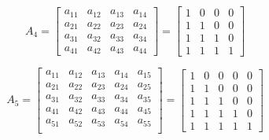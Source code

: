 \documentclass[12pt,letterpaper,final]{report}
\begin{document}
\[
  A_4 =
  \begin{bmatrix}
    a_{11} & a_{12} & a_{13} & a_{14} \\
    a_{21} & a_{22} & a_{23} & a_{24} \\
    a_{31} & a_{32} & a_{33} & a_{34} \\
    a_{41} & a_{42} & a_{43} & a_{44}
  \end{bmatrix}
  =
  \begin{bmatrix}
    1 & 0 & 0 & 0 \\
    1 & 1 & 0 & 0 \\
    1 & 1 & 1 & 0 \\
    1 & 1 & 1 & 1
  \end{bmatrix}
\]

\[
  A_5 =
  \begin{bmatrix}
    a_{11} & a_{12} & a_{13} & a_{14} & a_{15} \\
    a_{21} & a_{22} & a_{23} & a_{24} & a_{25} \\
    a_{31} & a_{32} & a_{33} & a_{34} & a_{35} \\
    a_{41} & a_{42} & a_{43} & a_{44} & a_{45} \\
    a_{51} & a_{52} & a_{53} & a_{54} & a_{55} \\
  \end{bmatrix}
  =
  \begin{bmatrix}
    1 & 0 & 0 & 0 & 0 \\
    1 & 1 & 0 & 0 & 0 \\
    1 & 1 & 1 & 0 & 0 \\
    1 & 1 & 1 & 1 & 0 \\
    1 & 1 & 1 & 1 & 1
  \end{bmatrix}
\]
\end{document}
